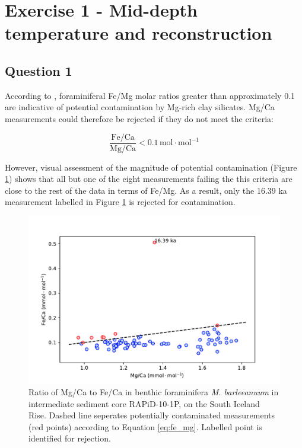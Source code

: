 \section{Exercise 1 - Mid-depth temperature and  reconstruction}

\subsection{Question 1}
\label{sec:Q1}
According to \citeauthor{barker2003study} \parencite{barker2003study}, foraminiferal Fe/Mg molar ratios greater than approximately 0.1 are indicative of potential contamination by Mg-rich clay silicates.
Mg/Ca measurements could therefore be rejected if they do not meet the criteria:

\begin{equation} \label{eq:fe_mg}
    \frac{\mathrm{Fe}/\mathrm{Ca}}{\mathrm{Mg}/\mathrm{Ca}} < 0.1 \, \mathrm{mol \cdot mol^{-1}}
\end{equation}

However, visual assessment of the magnitude of potential contamination (Figure \ref{fig:Mg_Fe}) shows that all but one of the eight measurements failing the this criteria are close to the rest of the data in terms of Fe/Mg.
As a result, only the 16.39 ka measurement labelled in Figure \ref{fig:Mg_Fe} is rejected for contamination.

\begin{figure}[h!]
\includegraphics[width=\textwidth]{img/scatter_MgCa_x_FeCa_contaminated.pdf}
    \caption{Ratio of Mg/Ca to Fe/Ca in benthic foraminifera \emph{M. barleeanuum} in intermediate sediment core RAPiD-10-1P, on the South Iceland Rise.
             Dashed line seperates potentially contaminated measurements (red points) according to Equation \ref{eq:fe_mg}.
             Labelled point is identified for rejection.}
        \label{fig:Mg_Fe}
\end{figure}


